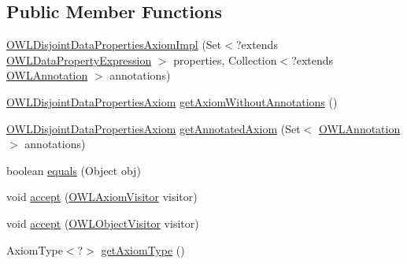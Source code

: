 \subsection*{Public Member Functions}
\begin{DoxyCompactItemize}
\item 
\hyperlink{classuk_1_1ac_1_1manchester_1_1cs_1_1owl_1_1owlapi_1_1_o_w_l_disjoint_data_properties_axiom_impl_a6e76f9b20d8eab02ecc495892117625d}{O\-W\-L\-Disjoint\-Data\-Properties\-Axiom\-Impl} (Set$<$?extends \hyperlink{interfaceorg_1_1semanticweb_1_1owlapi_1_1model_1_1_o_w_l_data_property_expression}{O\-W\-L\-Data\-Property\-Expression} $>$ properties, Collection$<$?extends \hyperlink{interfaceorg_1_1semanticweb_1_1owlapi_1_1model_1_1_o_w_l_annotation}{O\-W\-L\-Annotation} $>$ annotations)
\item 
\hyperlink{interfaceorg_1_1semanticweb_1_1owlapi_1_1model_1_1_o_w_l_disjoint_data_properties_axiom}{O\-W\-L\-Disjoint\-Data\-Properties\-Axiom} \hyperlink{classuk_1_1ac_1_1manchester_1_1cs_1_1owl_1_1owlapi_1_1_o_w_l_disjoint_data_properties_axiom_impl_a83ba488b2b3ebd6c3f8fb52fc0c48dd1}{get\-Axiom\-Without\-Annotations} ()
\item 
\hyperlink{interfaceorg_1_1semanticweb_1_1owlapi_1_1model_1_1_o_w_l_disjoint_data_properties_axiom}{O\-W\-L\-Disjoint\-Data\-Properties\-Axiom} \hyperlink{classuk_1_1ac_1_1manchester_1_1cs_1_1owl_1_1owlapi_1_1_o_w_l_disjoint_data_properties_axiom_impl_abca91accd29abc268db9bda6ca45a72c}{get\-Annotated\-Axiom} (Set$<$ \hyperlink{interfaceorg_1_1semanticweb_1_1owlapi_1_1model_1_1_o_w_l_annotation}{O\-W\-L\-Annotation} $>$ annotations)
\item 
boolean \hyperlink{classuk_1_1ac_1_1manchester_1_1cs_1_1owl_1_1owlapi_1_1_o_w_l_disjoint_data_properties_axiom_impl_af560c7ee91986d78a50c171e1062de39}{equals} (Object obj)
\item 
void \hyperlink{classuk_1_1ac_1_1manchester_1_1cs_1_1owl_1_1owlapi_1_1_o_w_l_disjoint_data_properties_axiom_impl_a4d82db24c7537aedbbf06e88fa0f23aa}{accept} (\hyperlink{interfaceorg_1_1semanticweb_1_1owlapi_1_1model_1_1_o_w_l_axiom_visitor}{O\-W\-L\-Axiom\-Visitor} visitor)
\item 
void \hyperlink{classuk_1_1ac_1_1manchester_1_1cs_1_1owl_1_1owlapi_1_1_o_w_l_disjoint_data_properties_axiom_impl_a66e20da09a8f6bd2140a7c4aa0c6fa74}{accept} (\hyperlink{interfaceorg_1_1semanticweb_1_1owlapi_1_1model_1_1_o_w_l_object_visitor}{O\-W\-L\-Object\-Visitor} visitor)
\item 
Axiom\-Type$<$?$>$ \hyperlink{classuk_1_1ac_1_1manchester_1_1cs_1_1owl_1_1owlapi_1_1_o_w_l_disjoint_data_properties_axiom_impl_ae434d2d992f3d3d817d23112673c0242}{get\-Axiom\-Type} ()
\end{DoxyCompactItemize}
